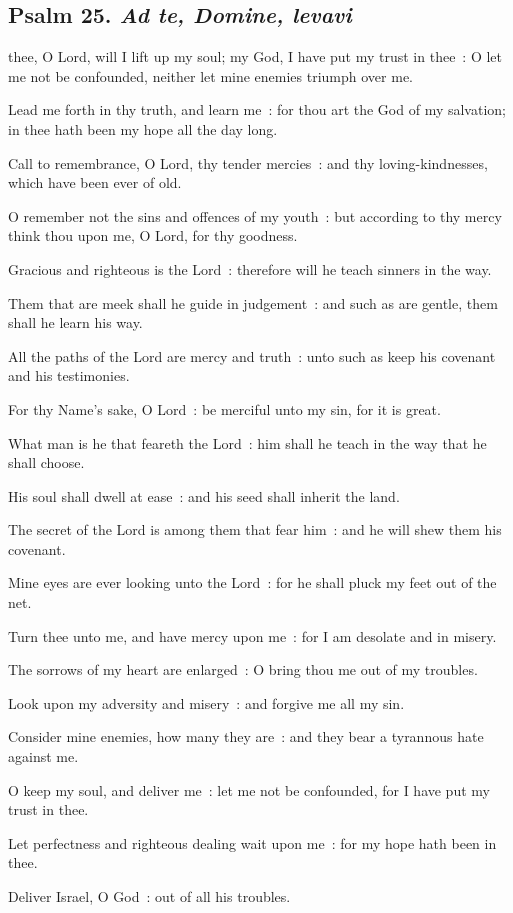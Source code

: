 \subsection{Psalm 25. \textit{Ad te, Domine, levavi}}

 thee, O Lord, will I lift up my soul; my God, I have put my trust in thee~: O let me not be confounded, neither let mine enemies triumph over me.\par
{}
Lead me forth in thy truth, and learn me~: for thou art the God of my salvation; in thee hath been my hope all the day long.\par
{}Call to remembrance, O Lord, thy tender mercies~: and thy loving-kindnesses, which have been ever of old.\par
{}O remember not the sins and offences of my youth~: but according to thy mercy think thou upon me, O Lord, for thy goodness.\par
{}Gracious and righteous is the Lord~: therefore will he teach sinners in the way.\par
{}Them that are meek shall he guide in judgement~: and such as are gentle, them shall he learn his way.\par
{}All the paths of the Lord are mercy and truth~: unto such as keep his covenant and his testimonies.\par
{}For thy Name's sake, O Lord~: be merciful unto my sin, for it is great.\par
{}What man is he that feareth the Lord~: him shall he teach in the way that he shall choose.\par
{}His soul shall dwell at ease~: and his seed shall inherit the land.\par
{}The secret of the Lord is among them that fear him~: and he will shew them his covenant.\par
{}Mine eyes are ever looking unto the Lord~: for he shall pluck my feet out of the net.\par
{}Turn thee unto me, and have mercy upon me~: for I am desolate and in misery.\par
{}The sorrows of my heart are enlarged~: O bring thou me out of my troubles.\par
{}Look upon my adversity and misery~: and forgive me all my sin.\par
{}Consider mine enemies, how many they are~: and they bear a tyrannous hate against me.\par
{}O keep my soul, and deliver me~: let me not be confounded, for I have put my trust in thee.\par
{}Let perfectness and righteous dealing wait upon me~: for my hope hath been in thee.\par
{}Deliver Israel, O God~: out of all his troubles.\par


